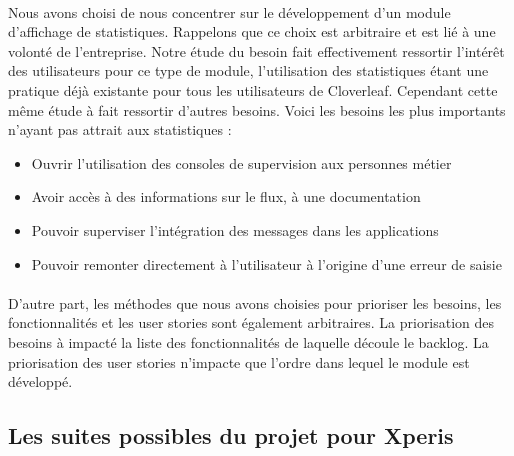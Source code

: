 			\paragraph{}%
			Nous avons choisi de nous concentrer sur le développement d'un module
			d'affichage de statistiques. Rappelons que ce choix est arbitraire et est lié
			à une volonté de l'entreprise. Notre étude du besoin fait effectivement
			ressortir l'intérêt des utilisateurs pour ce type de module, l'utilisation
			des statistiques étant une pratique déjà existante pour tous les utilisateurs
			de Cloverleaf. Cependant cette même étude à fait ressortir d'autres besoins.
			Voici les besoins les plus importants n'ayant pas attrait aux statistiques :
			\begin{itemize}
			  \item Ouvrir l'utilisation des consoles de supervision aux personnes métier
			  \item Avoir accès à des informations sur le flux, à une documentation
			  \item Pouvoir superviser l'intégration des messages dans les applications
			  \item Pouvoir remonter directement à l'utilisateur à l'origine d'une erreur
			  de saisie
			\end{itemize}
			
			\paragraph{}%
			D'autre part, les méthodes que nous avons choisies pour prioriser les
			besoins, les fonctionnalités et les user stories sont également arbitraires. La
			priorisation des besoins à impacté la liste des fonctionnalités de laquelle
			découle le backlog. La priorisation des user stories n'impacte que l'ordre
			dans lequel le module est développé.
			
		\subsection{Les suites possibles du projet pour Xperis}

